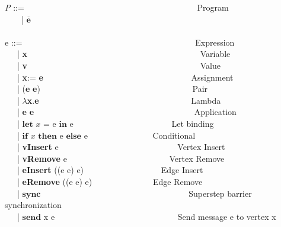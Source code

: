 \begin{frame}
  \tiny{
    \textit{P} ::= \ \ \ \ \ \ \ \ \ \ \ \ \ \ \ \ \ \ \ \ \ \ \ \ \ \ \ \ \ \ \ \ \ \ \ \ \ \ \ \ \ Program \\
    \ \ \ \  | $\overline {\textbf{e}}$ \\
\ \\
  e ::= \ \ \ \ \ \ \ \ \ \ \ \ \ \ \ \ \ \ \ \ \ \ \ \ \ \ \ \ \ \ \ \ \ \ \ \ \ \ \ \ \ Expression \\
  \ \ \ | \textbf{x} \ \ \ \ \ \ \ \ \ \ \  \ \ \ \ \ \ \ \ \ \ \ \ \ \ \ \ \ \ \ \ \ \ \ \ \ \ \ \ \ \ Variable \\
  \ \ \ | \textbf{v}  \ \ \ \ \ \ \ \ \ \ \ \  \ \ \ \ \ \ \ \ \ \ \ \ \ \ \ \ \ \ \ \ \ \ \ \ \ \ \ \ \ Value \\
  \ \ \ | \textbf{x}:= \textbf{e}   \ \ \ \ \ \ \ \ \ \ \ \  \ \ \ \ \ \ \ \ \ \ \ \ \ \ \ \ \ \ \ \ \ \ \ Assignment \\
  \ \ \ | (\textbf{e} \textbf{e})   \ \ \ \ \ \ \ \ \ \ \  \ \ \ \ \ \ \ \ \ \ \ \ \ \ \ \ \ \ \ \ \ \ \ \ \ Pair \\
  \ \ \ | $\lambda$\textbf{x}.\textbf{e}  \ \ \ \ \ \ \ \ \ \ \  \ \ \ \ \ \ \ \ \ \ \ \ \ \ \ \ \ \ \ \ \ \ \ \ \ Lambda \\
  \ \ \ | \textbf{e} \textbf{e}   \ \ \ \ \ \ \ \ \ \ \  \ \ \ \ \ \ \ \ \ \ \ \ \ \ \ \ \ \ \ \ \ \ \ \ \ \ \ Application \\
  \ \ \ |  $\textbf{let}$ $x$ $\textbf{=}$ e $\textbf{in}$ e  \ \ \ \ \ \ \ \ \ \ \ \ \ \ \ \ \ \ \ \ \ \ \ Let binding \\
  \ \ \ |  $\textbf{if}$ $x$ $\textbf{then}$ e $\textbf{else}$ e \ \ \ \ \ \ \ \ \ \ \ \ \ \ \  Conditional \\
  \ \ \ |  \textbf{vInsert} e  \ \ \ \ \ \ \ \ \ \ \ \ \ \ \ \ \ \ \ \ \ \ \ \ \ \ \ \ Vertex Insert \\
  \ \ \ |  \textbf{vRemove} e \ \ \ \ \ \ \ \ \ \ \ \ \ \ \ \ \ \ \ \ \ \ \ \ Vertex Remove \\
  \ \ \ |  \textbf{eInsert} ((e e) e)  \ \ \ \ \ \ \ \ \ \ \ \ \ \ \ \ \ \ Edge Insert \\
  \ \ \ |  \textbf{eRemove} ((e e) e)   \ \ \ \ \ \ \ \ \ \ \ \ \ \ Edge Remove \\
  \ \ \ |  $\textbf{sync}$ \ \ \ \ \ \ \ \ \ \ \ \ \ \ \ \  \ \ \ \ \ \ \ \  \ \ \ \ \ \ \ \ \ \ \  Superstep barrier synchronization\\
  \ \ \ |  $\textbf{send}$ x e \ \ \ \ \ \ \ \ \ \ \ \ \ \ \ \ \ \ \ \ \ \ \ \ \ \ \ \ \  Send message e to vertex x \\
}
\end{frame}
